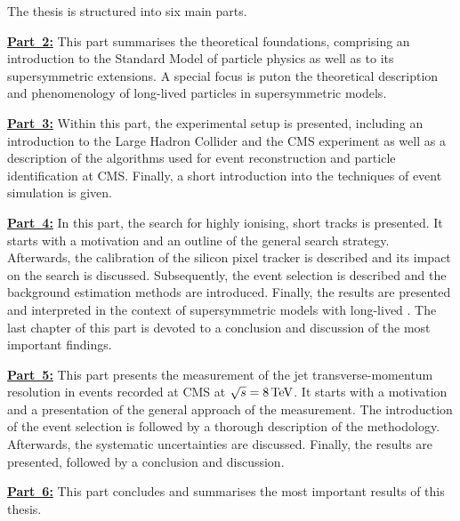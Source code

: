 \noindent The thesis is structured into six main parts.
\begin{description} 
\item \textbf{\hyperref[part:Theory]{Part~2:}} This part summarises the theoretical foundations, comprising an introduction to the Standard Model of particle physics as well as to its supersymmetric extensions. A special focus is puton the theoretical description and phenomenology of long-lived particles in supersymmetric models. 
\item \textbf{\hyperref[part:Experiment]{Part~3:}} Within this part, the experimental setup is  presented, including an introduction to the Large Hadron Collider and the CMS experiment as well as a description of the algorithms used for event reconstruction and particle identification at CMS. Finally, a short introduction into the techniques of event simulation is given.
\item \textbf{\hyperref[part:analysis]{Part~4:}}  In this part, the search for highly ionising, short tracks is presented. It starts with a motivation and an outline of the general search strategy. Afterwards, the calibration of the silicon pixel tracker is described and its impact on the search is discussed. Subsequently, the event selection is described and the background estimation methods are introduced. Finally, the results are presented and interpreted in the context of supersymmetric models with long-lived \chipm. The last chapter of this part is devoted to a conclusion and discussion of the most important findings.
\item \textbf{\hyperref[part:resolution]{Part~5:}} This part presents the measurement of the jet transverse-momentum resolution in \GAMJET events recorded at CMS at $\sqrt{s}=8\,\text{Te}\kern-0.06667em\text{V}$. It starts with a motivation and a presentation of the general approach of the measurement. The introduction of the event selection is followed by a thorough description of the methodology. Afterwards, the systematic uncertainties are discussed. Finally, the results are presented, followed by a conclusion and discussion.
\item \textbf{\hyperref[part:Summary]{Part~6:}} This part concludes and summarises the most important results of this thesis. 
\end{description}

